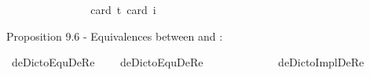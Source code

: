 \begin{isabellebody}
\isamarkupfalse%
\ {\isachardoublequoteopen}{\isasymlfloor}\isactrlbold {\isasymforall}{\isasymalpha}{\isachardot}\ {\isacharparenleft}{\isacharparenleft}{\isasymlambda}{\isasymbeta}{\isachardot}\ \isactrlbold {\isasymbox}{\isacharparenleft}{\isasymalpha}\ {\isasymbeta}{\isacharparenright}{\isacharparenright}\ \isactrlbold {\isasymdown}{\isacharparenleft}{\isasymtau}{\isacharcolon}{\isacharcolon}{\isasymup}{\isasymlangle}{\isasymzero}{\isasymrangle}{\isacharparenright}{\isacharparenright}\ \isactrlbold {\isasymleftrightarrow}\ \isactrlbold {\isasymbox}{\isacharparenleft}\ {\isacharparenleft}{\isasymlambda}{\isasymbeta}{\isachardot}\ {\isacharparenleft}{\isasymalpha}\ {\isasymbeta}{\isacharparenright}{\isacharparenright}\ \isactrlbold {\isasymdown}{\isasymtau}{\isacharparenright}{\isasymrfloor}{\isachardoublequoteclose}\ \isanewline
\ \ \isamarkupfalse%
{\isacharbrackleft}card\ {\isacharprime}t{\isacharequal}{}{\isacharcomma}\ card\ i{\isacharequal}{}{\isacharbrackright}%
\isadelimproof
\ %
\endisadelimproof
%
\isatagproof
{}\isamarkupfalse%
\ %
%
\endisatagproof
{\isafoldproof}%
%
\isadelimproof
%
\endisadelimproof
%
\begin{isamarkuptext}%
Proposition 9.6 - Equivalences between  and :%
\end{isamarkuptext}\isamarkuptrue%
\isamarkupfalse%
\ deDictoEquDeRe{\isacharcolon}{\isacharcolon}{\isachardoublequoteopen}{\isasymup}{\isasymlangle}{\isasymup}{\isasymzero}{\isasymrangle}{\isachardoublequoteclose}\ \isanewline
\ \ \ {\isachardoublequoteopen}deDictoEquDeRe\ {\isasymtau}\ {\isasymequiv}\ \isactrlbold {\isasymforall}{\isasymalpha}{\isachardot}\ {\isacharparenleft}{\isacharparenleft}{\isasymlambda}{\isasymbeta}{\isachardot}\ \isactrlbold {\isasymbox}{\isacharparenleft}{\isasymalpha}\ {\isasymbeta}{\isacharparenright}{\isacharparenright}\ \isactrlbold {\isasymdownharpoonleft}{\isasymtau}{\isacharparenright}\ \isactrlbold {\isasymleftrightarrow}\ \isactrlbold {\isasymbox}{\isacharparenleft}{\isacharparenleft}{\isasymlambda}{\isasymbeta}{\isachardot}\ {\isacharparenleft}{\isasymalpha}\ {\isasymbeta}{\isacharparenright}{\isacharparenright}\ \isactrlbold {\isasymdownharpoonleft}{\isasymtau}{\isacharparenright}{\isachardoublequoteclose}\isanewline
{}\isamarkupfalse%
\ deDictoImplDeRe{\isacharcolon}{\isacharcolon}{\isachardoublequoteopen}{\isasymup}{\isasymlangle}{\isasymup}{\isasymzero}{\isasymrangle}{\isachardoublequoteclose}\ \isanewline

\end{isabellebody}
